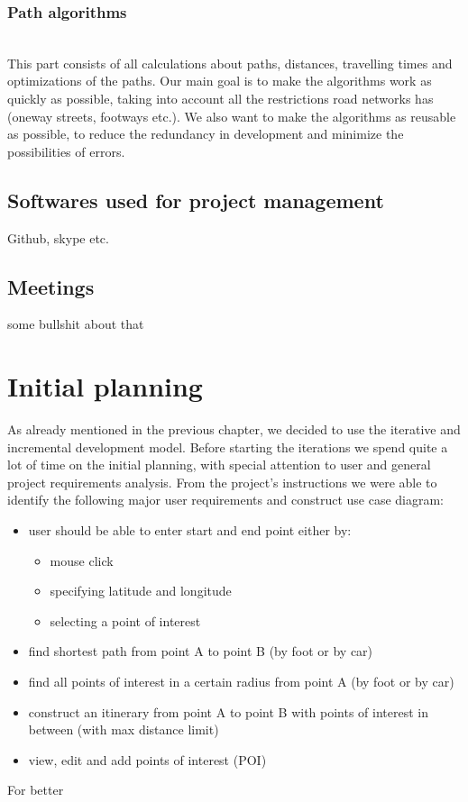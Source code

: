 \documentclass[reqno,openany,12pt]{amsbook}
\theoremstyle{definition}
\theoremstyle{remark}
\begin{document}
\subsection{Path algorithms}\hspace*{\fill} \\
This part consists of all calculations about paths, distances, travelling times and optimizations of the paths. Our main goal is to make the algorithms work as quickly as possible, taking into account all the restrictions road networks has (oneway streets, footways etc.). We also want to make the algorithms as reusable as possible, to reduce the redundancy in development and minimize the possibilities of errors.
\section{Softwares used for project management}
Github, skype etc.
\section{Meetings}
some bullshit about that

\chapter{Initial planning}
As already mentioned in the previous chapter, we decided to use the iterative and incremental development model. Before starting the iterations we spend quite a lot of time on the initial planning, with special attention to user and general project requirements analysis. From the project's instructions we were able to identify the following major user requirements and construct use case diagram:
\begin{itemize}
\item user should be able to enter start and end point either by:
\begin{itemize}
\item mouse click
\item specifying latitude and longitude
\item selecting a point of interest
\end{itemize}
\item find shortest path from point A to point B (by foot or by car)
\item find all points of interest in a certain radius from point A (by foot or by car)
\item construct an itinerary from point A to point B with points of interest in between (with max distance limit)
\item view, edit and add points of interest (POI)
\end{itemize}
For better 
\end{document}
